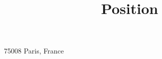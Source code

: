 \title{Position}
\address{\textnormal{55-57 Rue du Faubourg-Saint-Honoré}}{\textnormal{75008 Paris, France}}

